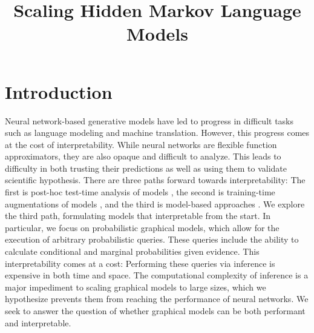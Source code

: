\documentclass{article}
\title{Scaling Hidden Markov Language Models}
\begin{document}
\maketitle


\section{Introduction}
Neural network-based generative models have led to progress in
difficult tasks such as language modeling and machine translation.
However, this progress comes at the cost of interpretability.
While neural networks are flexible function approximators,
they are also opaque and difficult to analyze.
This leads to difficulty in both trusting their predictions as well as
using them to validate scientific hypothesis.
There are three paths forward towards interpretability:
The first is post-hoc test-time analysis of models \citep{tenney2019probing},
the second is training-time augmentations of models \citep{},
and the third is model-based approaches \citep{}.
We explore the third path,
formulating models that interpretable from the start.
In particular, we focus on probabilistic graphical models,
which allow for the execution of arbitrary probabilistic queries.
These queries include
the ability to calculate conditional and marginal probabilities given evidence.
This interpretability comes at a cost:
Performing these queries via inference is expensive in both time and space.
The computational complexity of inference is a major impediment to scaling
graphical models to large sizes, which we hypothesize prevents them from
reaching the performance of neural networks.
We seek to answer the question of whether graphical models can be both
performant and interpretable.
\end{document}
